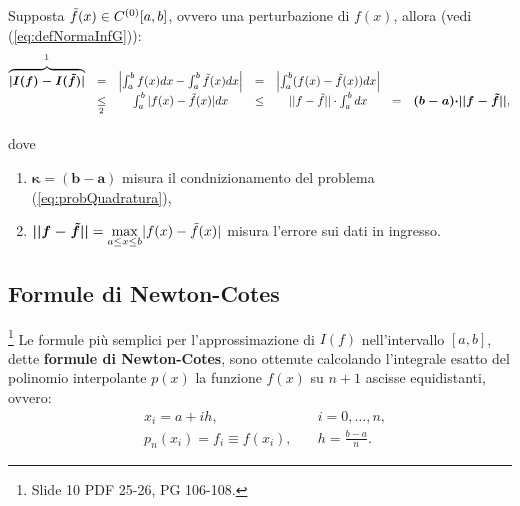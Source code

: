 \begin{definition}
    Supposta $\Tilde{f}(x)\in C^{(0)}[a,b]$, ovvero una perturbazione di $f(x)$, allora (vedi (\ref{eq:defNormaInfG})):
    \begin{equation*}
        \begin{matrix}
            \overbrace{\boldsymbol{|I(f)-I(\Tilde{f})|}}^{\footnotemark} &=& \left|\int_{a}^{b}f(x)dx-\int_{a}^{b}\Tilde{f}(x)dx\right| &=& \left|\int_{a}^{b}(f(x)-\Tilde{f}(x))dx\right|\\
             &\underset{\footnotemark}{\leq}&\int_{a}^{b}|f(x)-\Tilde{f}(x)|dx&\leq& ||f-\Tilde{f}||\cdot\int_{a}^{b}dx &=&\boldsymbol{(b-a)\cdot}\boldsymbol{||f-\Tilde{f}||},
        \end{matrix}
    \end{equation*}
    
    \addtocounter{footnote}{-1}
    
    
    \noindent dove
    \begin{enumerate}
    	\item $\boldsymbol{\kappa=(b-a)}$ misura il condnizionamento del problema (\ref{eq:probQuadratura}),
    	\item $\boldsymbol{||f-\Tilde{f}||}=\underset{a\leq x\leq b}{\max} |f(x)-\Tilde{f}(x)|$ misura l'errore sui dati in ingresso.
    \end{enumerate}
\end{definition}

\subsection{Formule di Newton-Cotes}\label{ssec:formN-C}\footnote{Slide 10 PDF 25-26, PG 106-108.}
Le formule più semplici per l'approssimazione di $I(f)$ nell'intervallo $[a,b]$, dette \textbf{formule di Newton-Cotes}, sono ottenute calcolando l'integrale esatto del polinomio interpolante $p(x)$ la funzione $f(x)$ su $n+1$ ascisse equidistanti, ovvero:
\begin{equation}\label{eq:condizione_ascisse_equidistanti_N-C}
    \begin{matrix}
        &x_i=a+ih,&\quad i=0,\hdots,n,\\
        &p_n(x_i)=f_i \equiv f(x_i),&\quad h=\frac{b-a}{n}.
    \end{matrix}
\end{equation}

